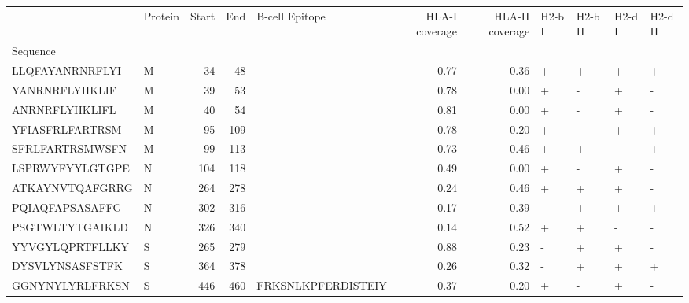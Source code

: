 \begin{tabular}{llrrlrrllll}
\toprule
{} & Protein &  Start &   End &      B-cell Epitope &  HLA-I coverage &  HLA-II coverage & H2-b I & H2-b II & H2-d I & H2-d II \\
Sequence        &         &        &       &                     &                 &                  &        &         &        &         \\
\midrule
LLQFAYANRNRFLYI &       M &     34 &    48 &                     &            0.77 &             0.36 &      + &       + &      + &       + \\
YANRNRFLYIIKLIF &       M &     39 &    53 &                     &            0.78 &             0.00 &      + &       - &      + &       - \\
ANRNRFLYIIKLIFL &       M &     40 &    54 &                     &            0.81 &             0.00 &      + &       - &      + &       - \\
YFIASFRLFARTRSM &       M &     95 &   109 &                     &            0.78 &             0.20 &      + &       - &      + &       + \\
SFRLFARTRSMWSFN &       M &     99 &   113 &                     &            0.73 &             0.46 &      + &       + &      - &       + \\
LSPRWYFYYLGTGPE &       N &    104 &   118 &                     &            0.49 &             0.00 &      + &       - &      + &       - \\
ATKAYNVTQAFGRRG &       N &    264 &   278 &                     &            0.24 &             0.46 &      + &       + &      + &       - \\
PQIAQFAPSASAFFG &       N &    302 &   316 &                     &            0.17 &             0.39 &      - &       + &      + &       + \\
PSGTWLTYTGAIKLD &       N &    326 &   340 &                     &            0.14 &             0.52 &      + &       + &      - &       - \\
YYVGYLQPRTFLLKY &       S &    265 &   279 &                     &            0.88 &             0.23 &      - &       + &      + &       - \\
DYSVLYNSASFSTFK &       S &    364 &   378 &                     &            0.26 &             0.32 &      - &       + &      + &       + \\
GGNYNYLYRLFRKSN &       S &    446 &   460 &  FRKSNLKPFERDISTEIY &            0.37 &             0.20 &      + &       - &      + &       - \\

\end{tabular}
